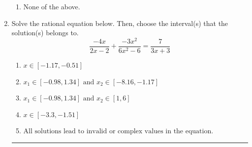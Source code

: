 \documentclass[14pt]{extbook}
\newcommand{\litem}[1]{\item#1\hspace*{-1cm}\rule{\textwidth}{0.4pt}}
\begin{document}
\begin{enumerate}
{\begin{enumerate}[label=\Alph*.]
\item None of the above.
\end{enumerate} }
\litem{
Solve the rational equation below. Then, choose the interval(s) that the solution(s) belongs to.\[ \frac{-4x}{2x -2} + \frac{-3x^{2}}{6x^{2} -6} = \frac{7}{3x + 3} \]\begin{enumerate}[label=\Alph*.]
\item \( x \in [-1.17,-0.51] \)
\item \( x_1 \in [-0.98, 1.34] \text{ and } x_2 \in [-8.16,-1.17] \)
\item \( x_1 \in [-0.98, 1.34] \text{ and } x_2 \in [1,6] \)
\item \( x \in [-3.3,-1.51] \)
\item \( \text{All solutions lead to invalid or complex values in the equation.} \)

\end{enumerate} }
\end{enumerate}
\end{document}
